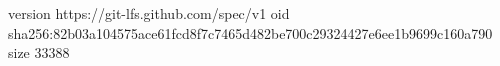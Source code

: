 version https://git-lfs.github.com/spec/v1
oid sha256:82b03a104575ace61fcd8f7c7465d482be700c29324427e6ee1b9699c160a790
size 33388
